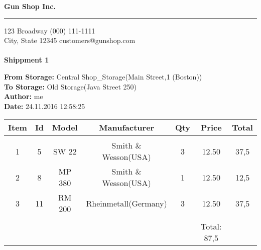 \documentclass{article}
\begin{document}
\hfil{\Huge\bf Gun Shop Inc.}\hfil
\bigskip
\hrule
\bigskip

123 Broadway \hfill (000) 111-1111 \\
City, State 12345 \hfill customers@gunshop.com\\ \\

\hfill{\bf Shippment 1}\hfill
\bigskip

{\bf From Storage:}   Central Shop\_Storage(Main Street,1 (Boston))\\
{\bf To Storage:}  Old Storage(Java Street 250) \\
{\bf Author:}  me \\ 
{\bf Date:}  24.11.2016 12:58:25 \\
\begin{center}
\begin{tabular}{ c c c c c c c }
  Item & Id & Model & Manufacturer & Qty & Price & Total  \\[2ex]
\hline\\
 1 & 5 & SW 22& Smith \& Wesson(USA)& 3 & 12.50 & 37,5 \\ [2ex] 2 & 8 & MP 380& Smith \& Wesson(USA)& 1 & 12.50 & 12,5 \\ [2ex] 3 & 11 & RM 200& Rheinmetall(Germany)& 3 & 12.50 & 37,5 \\ [2ex]\hline\\&&&&&Total: 87,5&\end{tabular}\end{center}
\end{document}
